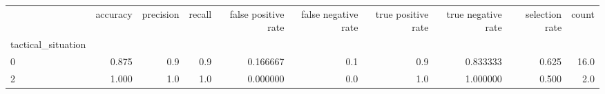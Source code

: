 \begin{tabular}{lrrrrrrrrr}
\toprule
{} &  accuracy &  precision &  recall &  false positive rate &  false negative rate &  true positive rate &  true negative rate &  selection rate &  count \\
tactical\_situation &           &            &         &                      &                      &                     &                     &                 &        \\
\midrule
0                  &     0.875 &        0.9 &     0.9 &             0.166667 &                  0.1 &                 0.9 &            0.833333 &           0.625 &   16.0 \\
2                  &     1.000 &        1.0 &     1.0 &             0.000000 &                  0.0 &                 1.0 &            1.000000 &           0.500 &    2.0 \\
\bottomrule
\end{tabular}

